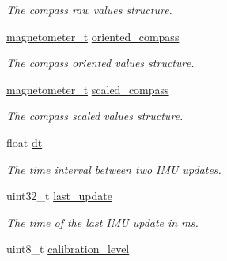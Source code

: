 \begin{DoxyCompactItemize}
\begin{DoxyCompactList}\small\item\em The compass raw values structure. \end{DoxyCompactList}\item 
\hypertarget{structimu__t_a353a44a2dc082798e1fb4f924a06d59f}{\hyperlink{structmagnetometer__t}{magnetometer\+\_\+t} \hyperlink{structimu__t_a353a44a2dc082798e1fb4f924a06d59f}{oriented\+\_\+compass}}\label{structimu__t_a353a44a2dc082798e1fb4f924a06d59f}

\begin{DoxyCompactList}\small\item\em The compass oriented values structure. \end{DoxyCompactList}\item 
\hypertarget{structimu__t_a20c571a4ff6e60694bb534ef7cfd7951}{\hyperlink{structmagnetometer__t}{magnetometer\+\_\+t} \hyperlink{structimu__t_a20c571a4ff6e60694bb534ef7cfd7951}{scaled\+\_\+compass}}\label{structimu__t_a20c571a4ff6e60694bb534ef7cfd7951}

\begin{DoxyCompactList}\small\item\em The compass scaled values structure. \end{DoxyCompactList}\item 
\hypertarget{structimu__t_a8ffa6ec64c78033084faa5e98d1be6bc}{float \hyperlink{structimu__t_a8ffa6ec64c78033084faa5e98d1be6bc}{dt}}\label{structimu__t_a8ffa6ec64c78033084faa5e98d1be6bc}

\begin{DoxyCompactList}\small\item\em The time interval between two I\+M\+U updates. \end{DoxyCompactList}\item 
\hypertarget{structimu__t_a2fc42fc6d0de13d52afa26d07b62d529}{uint32\+\_\+t \hyperlink{structimu__t_a2fc42fc6d0de13d52afa26d07b62d529}{last\+\_\+update}}\label{structimu__t_a2fc42fc6d0de13d52afa26d07b62d529}

\begin{DoxyCompactList}\small\item\em The time of the last I\+M\+U update in ms. \end{DoxyCompactList}\item 
\hypertarget{structimu__t_aaa07c2c219a76e9a3d7ecc6b190eca33}{uint8\+\_\+t \hyperlink{structimu__t_aaa07c2c219a76e9a3d7ecc6b190eca33}{calibration\+\_\+level}}\label{structimu__t_aaa07c2c219a76e9a3d7ecc6b190eca33}


\end{DoxyCompactItemize}
